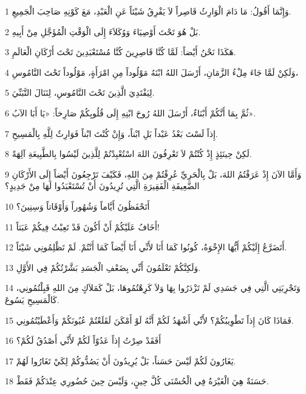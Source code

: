 \par 1 وَإِنَّمَا أَقُولُ: مَا دَامَ الْوَارِثُ قَاصِراً لاَ يَفْرِقُ شَيْئاً عَنِ الْعَبْدِ، مَعَ كَوْنِهِ صَاحِبَ الْجَمِيعِ.
\par 2 بَلْ هُوَ تَحْتَ أَوْصِيَاءَ وَوُكَلاَءَ إِلَى الْوَقْتِ الْمُؤَجَّلِ مِنْ أَبِيهِ.
\par 3 هَكَذَا نَحْنُ أَيْضاً: لَمَّا كُنَّا قَاصِرِينَ كُنَّا مُسْتَعْبَدِينَ تَحْتَ أَرْكَانِ الْعَالَمِ.
\par 4 وَلَكِنْ لَمَّا جَاءَ مِلْءُ الزَّمَانِ، أَرْسَلَ اللهُ ابْنَهُ مَوْلُوداً مِنِ امْرَأَةٍ، مَوْلُوداً تَحْتَ النَّامُوسِ،
\par 5 لِيَفْتَدِيَ الَّذِينَ تَحْتَ النَّامُوسِ، لِنَنَالَ التَّبَنِّيَ.
\par 6 ثُمَّ بِمَا أَنَّكُمْ أَبْنَاءٌ، أَرْسَلَ اللهُ رُوحَ ابْنِهِ إِلَى قُلُوبِكُمْ صَارِخاً: «يَا أَبَا الآبُ».
\par 7 إِذاً لَسْتَ بَعْدُ عَبْداً بَلِ ابْناً، وَإِنْ كُنْتَ ابْناً فَوَارِثٌ لِلَّهِ بِالْمَسِيحِ.
\par 8 لَكِنْ حِينَئِذٍ إِذْ كُنْتُمْ لاَ تَعْرِفُونَ اللهَ اسْتُعْبِدْتُمْ لِلَّذِينَ لَيْسُوا بِالطَّبِيعَةِ آلِهَةً.
\par 9 وَأَمَّا الآنَ إِذْ عَرَفْتُمُ اللهَ، بَلْ بِالْحَرِيِّ عُرِفْتُمْ مِنَ اللهِ، فَكَيْفَ تَرْجِعُونَ أَيْضاً إِلَى الأَرْكَانِ الضَّعِيفَةِ الْفَقِيرَةِ الَّتِي تُرِيدُونَ أَنْ تُسْتَعْبَدُوا لَهَا مِنْ جَدِيدٍ؟
\par 10 أَتَحْفَظُونَ أَيَّاماً وَشُهُوراً وَأَوْقَاتاً وَسِنِينَ؟
\par 11 أَخَافُ عَلَيْكُمْ أَنْ أَكُونَ قَدْ تَعِبْتُ فِيكُمْ عَبَثاً!
\par 12 أَتَضَرَّعُ إِلَيْكُمْ أَيُّهَا الإِخْوَةُ، كُونُوا كَمَا أَنَا لأَنِّي أَنَا أَيْضاً كَمَا أَنْتُمْ. لَمْ تَظْلِمُونِي شَيْئاً.
\par 13 وَلَكِنَّكُمْ تَعْلَمُونَ أَنِّي بِضَعْفِ الْجَسَدِ بَشَّرْتُكُمْ فِي الأَوَّلِ.
\par 14 وَتَجْرِبَتِي الَّتِي فِي جَسَدِي لَمْ تَزْدَرُوا بِهَا وَلاَ كَرِهْتُمُوهَا، بَلْ كَمَلاَكٍ مِنَ اللهِ قَبِلْتُمُونِي، كَالْمَسِيحِ يَسُوعَ.
\par 15 فَمَاذَا كَانَ إِذاً تَطْوِيبُكُمْ؟ لأَنِّي أَشْهَدُ لَكُمْ أَنَّهُ لَوْ أَمْكَنَ لَقَلَعْتُمْ عُيُونَكُمْ وَأَعْطَيْتُمُونِي.
\par 16 أَفَقَدْ صِرْتُ إِذاً عَدُوّاً لَكُمْ لأَنِّي أَصْدُقُ لَكُمْ؟
\par 17 يَغَارُونَ لَكُمْ لَيْسَ حَسَناً، بَلْ يُرِيدُونَ أَنْ يَصُدُّوكُمْ لِكَيْ تَغَارُوا لَهُمْ.
\par 18 حَسَنَةٌ هِيَ الْغَيْرَةُ فِي الْحُسْنَى كُلَّ حِينٍ، وَلَيْسَ حِينَ حُضُورِي عِنْدَكُمْ فَقَطْ.
